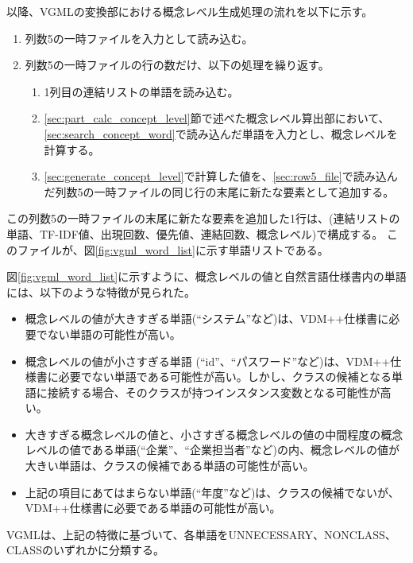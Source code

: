 以降、VGMLの変換部における概念レベル生成処理の流れを以下に示す。

\begin{enumerate}
    \item 列数5の一時ファイルを入力として読み込む。
    \label{sec:row5_file}
    \item 列数5の一時ファイルの行の数だけ、以下の処理を繰り返す。
        \begin{enumerate}
            \item 1列目の連結リストの単語を読み込む。
            \label{sec:search_concept_word}
            \item \ref{sec:part_calc_concept_level}節で述べた概念レベル算出部において、\ref{sec:search_concept_word}で読み込んだ単語を入力とし、概念レベルを計算する。
            \label{sec:generate_concept_level}
            \item \ref{sec:generate_concept_level}で計算した値を、\ref{sec:row5_file}で読み込んだ列数5の一時ファイルの同じ行の末尾に新たな要素として追加する。
        \end{enumerate}
\end{enumerate}

この列数5の一時ファイルの末尾に新たな要素を追加した1行は、(連結リストの単語、TF-IDF値、出現回数、優先値、連結回数、概念レベル)で構成する。
このファイルが、図\ref{fig:vgml_word_list}に示す単語リストである。

図\ref{fig:vgml_word_list}に示すように、概念レベルの値と自然言語仕様書内の単語には、以下のような特徴が見られた。

\begin{itemize}
    \item 概念レベルの値が大きすぎる単語(``システム''など)は、VDM++仕様書に必要でない単語の可能性が高い。
    \item 概念レベルの値が小さすぎる単語 (``id''、``パスワード''など)は、VDM++仕様書に必要でない単語である可能性が高い。しかし、クラスの候補となる単語に接続する場合、そのクラスが持つインスタンス変数となる可能性が高い。
    \item 大きすぎる概念レベルの値と、小さすぎる概念レベルの値の中間程度の概念レベルの値である単語(``企業''、``企業担当者''など)の内、概念レベルの値が大きい単語は、クラスの候補である単語の可能性が高い。
    \item 上記の項目にあてはまらない単語(``年度''など)は、クラスの候補でないが、VDM++仕様書に必要である単語の可能性が高い。
\end{itemize}

VGMLは、上記の特徴に基づいて、各単語をUNNECESSARY、NONCLASS、CLASSのいずれかに分類する。

